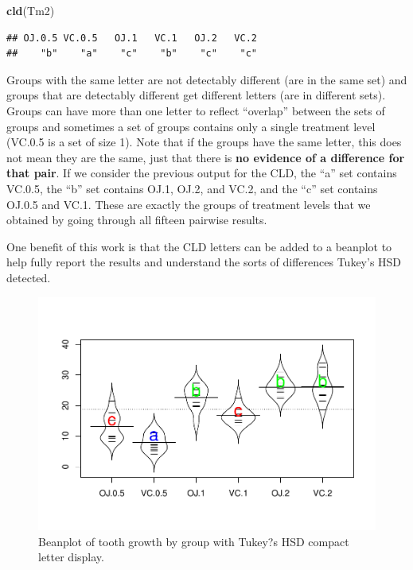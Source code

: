 \documentclass[]{book}
\newenvironment{Shaded}{\begin{snugshade}}{\end{snugshade}}
\newcommand{\KeywordTok}[1]{\textcolor[rgb]{0.13,0.29,0.53}{\textbf{#1}}}
\newcommand{\NormalTok}[1]{#1}
\theoremstyle{definition}
\theoremstyle{definition}
\theoremstyle{remark}
\begin{document}
\begin{Shaded}
\begin{Highlighting}[]
\KeywordTok{cld}\NormalTok{(Tm2)}
\end{Highlighting}
\end{Shaded}

\begin{verbatim}
## OJ.0.5 VC.0.5   OJ.1   VC.1   OJ.2   VC.2 
##    "b"    "a"    "c"    "b"    "c"    "c"
\end{verbatim}

Groups with the same letter are not detectably different (are in the
same set) and groups that are detectably different get different letters
(are in different sets). Groups can have more than one letter to reflect
``overlap'' between the sets of groups and sometimes a set of groups
contains only a single treatment level (VC.0.5 is a set of size 1). Note
that if the groups have the same letter, this does not mean they are the
same, just that there is \textbf{no evidence of a difference for that
pair}. If we consider the previous output for the CLD, the ``a'' set
contains VC.0.5, the ``b'' set contains OJ.1, OJ.2, and VC.2, and the
``c'' set contains OJ.0.5 and VC.1. These are exactly the groups of
treatment levels that we obtained by going through all fifteen pairwise
results.

One benefit of this work is that the CLD letters can be added to a
beanplot to help fully report the results and understand the sorts of
differences Tukey's HSD detected.




\begin{figure}
\centering
\includegraphics{03-oneWayAnova_files/figure-latex/Figure3-20-1.pdf}
\caption{\label{fig:Figure3-20}Beanplot of tooth growth by group with Tukey?s HSD compact
letter display.}
\end{figure}
\end{document}
